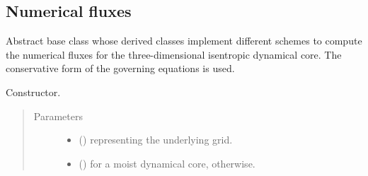 \documentclass[letterpaper,10pt,english]{sphinxmanual}
\begin{document}
\subsection{Numerical fluxes}
\label{\detokenize{api:numerical-fluxes}}

\begin{fulllineitems}
\label{\detokenize{api:dycore.flux_isentropic.FluxIsentropic}}
Abstract base class whose derived classes implement different schemes to compute the numerical fluxes for
the three-dimensional isentropic dynamical core. The conservative form of the governing equations is used.

\begin{fulllineitems}
\label{\detokenize{api:dycore.flux_isentropic.FluxIsentropic.__init__}}
Constructor.
\begin{quote}\begin{description}
\item[{Parameters}] \leavevmode\begin{itemize}
\item {} 
 () \textendash{} {\hyperref[\detokenize{api:grids.grid_xyz.GridXYZ}]{}} representing the underlying grid.

\item {} 
 () \textendash{}  for a moist dynamical core,  otherwise.

\end{itemize}

\end{description}\end{quote}

\end{fulllineitems}



\end{fulllineitems}
\end{document}

